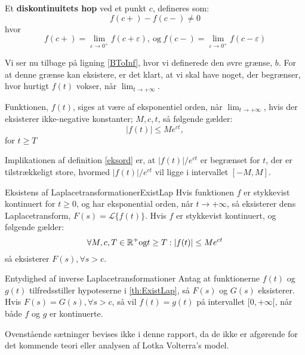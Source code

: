 \begin{definition}
Et \textbf{diskontinuitets hop} ved et punkt $c$, defineres som:
$$f(c+) - f(c-) \neq 0$$
hvor
$$f(c+) = \lim_{\varepsilon\to 0^+} f(c + \varepsilon), \ \text{og} \ f(c-) = \lim_{\varepsilon\to 0^+} f(c - \varepsilon)$$
\end{definition}

Vi ser nu tilbage på ligning \eqref{BToInf}, hvor vi definerede den øvre grænse, $b$. For at denne grænse kan eksistere, er det klart, at vi skal have noget, der begrænser, hvor hurtigt $f(t)$ vokser, når $\lim_{t\to+\infty}$.

\begin{definition}\label{eksord}
Funktionen, $f(t)$, siges at være af eksponentiel orden, når $\lim_{t\to+\infty}$, hvis der eksisterer ikke-negative konstanter; $M, c, t$, så følgende gælder:
$$ |f(t)| \leq Me^{ct},$$
for $t \geq T$
\end{definition}
Implikationen af definition \ref{eksord} er, at $|f(t)| / e^{ct}$ er begrænset for $t$, der er tilstrækkeligt store, hvormed $|f(t)| / e^{ct}$ vil ligge i intervallet $[-M, M]$.

\begin{mytheo}{Eksistens af Laplacetransformationer}{ExistLap}
Hvis funktionen $f$ er stykkevist kontinuert for $t \geq 0$, og har eksponential orden, når $t \to +\infty$, så eksisterer dens Laplacetransform, $F(s) = \mathcal{L}\{f(t)\}$. Hvis $f$ er stykkevist kontinuert, og følgende gælder:
$$\forall M,c,T \in \mathbb{R}^+ \textnormal{og} t \geq T: |f(t)| \leq Me^{ct}$$
så eksisterer $F(s), \forall s > c$.
\end{mytheo}


\begin{mytheo}{Entydighed af inverse Laplacetransformationer}{}
Antag at funktionerne $f(t)$ og $g(t)$ tilfredsstiller hypoteserne i \ref{th:ExistLap}, så $F(s)$ og $G(s)$ eksisterer. Hvis $F(s) = G(s), \forall s > c$, så vil $f(t) = g(t)$ på intervallet $[0,+\infty[$, når både $f$ og $g$ er kontinuerte.
\end{mytheo}
Ovenstående sætninger bevises ikke i denne rapport, da de ikke er afgørende for det kommende teori eller analysen af Lotka Volterra's model.